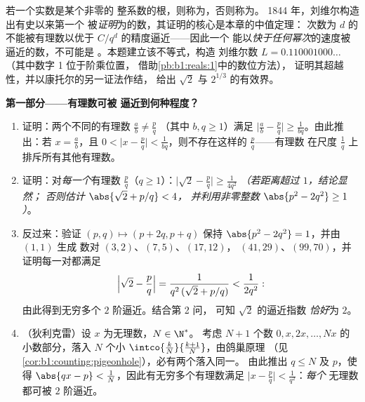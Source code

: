 \begin{problem}
\label{pb:b1:derivative:1}
若一个实数是某个非零的
整系数的根，则称为\emph{}，否则称为\emph{}。
1844 年，刘维尔构造出有史以来第一个
被\emph{证明}为的数，其证明的核心是本章的中值定理：
次数为 $d$ 的
不能被有理数以优于 $C/q^d$ 的精度逼近——因此一个
能以\emph{快于任何幂次}的速度被逼近的数，不可能是
。本题建立该不等式，构造
刘维尔数 $L = 0.110001000\dots$（其中数字 1 位于阶乘位置，
借助\cref{pb:b1:reals:1}中的数位方法），
证明其超越性，并以康托尔的另一证法作结，
给出 $\sqrt2$ 与
$2^{1/3}$ 的有效界。

\medskip
\noindent\textbf{第一部分——有理数可被
逼近到何种程度？}
\begin{enumerate}
  \item 证明：两个不同的有理数 $\frac ab \neq \frac pq$
        （其中 $b, q \geq 1$）满足 $\bigl|\frac ab -
        \frac pq\bigr| \geq \frac{1}{bq}$。由此推出：若 $x =
        \frac ab$，且 $0 < \bigl|x - \frac pq\bigr| <
        \frac{1}{bq}$，则不存在这样的 $\frac pq$——有理数
        在尺度 $\frac 1q$ 上排斥所有其他有理数。
  \item 证明：对\emph{每一个}有理数 $\frac pq$（$q \geq
        1$）：$\bigl|\sqrt2 - \frac pq\bigr| \geq
        \frac{1}{4q^2}$ \emph{（若距离超过 $1$，结论显然；
        否则估计 $\abs{\sqrt2 + p/q} < 4$，
        并利用非零整数 $\abs{p^2 - 2q^2} \geq 1$）}。
  \item 反过来：验证 $(p, q) \mapsto (p +
        2q, p + q)$ 保持 $\abs{p^2 - 2q^2} = 1$，并由 $(1,1)$ 生成
        数对 $(3,2)$、$(7,5)$、$(17,12)$，
        $(41,29)$、$(99,70)$，并证明每一对都满足
        \[
        \Bigl|\sqrt2 - \frac pq\Bigr| =
        \frac{1}{q^2\,(\sqrt2 + p/q)} < \frac{1}{2q^2} :
        \]
        由此得到无穷多个 $2$ 阶逼近。结合第 2 问，
        可知 $\sqrt 2$ 的逼近指数
        \emph{恰好}为 $2$。
  \item （狄利克雷）设 $x$ 为无理数，$N \in \N^*$。
        考虑 $N + 1$ 个数 $0, x, 2x,
        \dots, Nx$ 的小数部分，落入 $N$ 个小 $\intco{\frac kN}{\frac{k +
        1}{N}}$，由鸽巢原理
        （见\cref{cor:b1:counting:pigeonhole}），必有两个落入同一。
        由此推出 $q \leq N$ 及 $p$，使得 $\abs{qx - p} <
        \frac 1N$，因此有无穷多个有理数满足
        $\bigl|x - \frac pq\bigr| < \frac{1}{q^2}$：\emph{每个}
        无理数都可被 $2$ 阶逼近。
\end{enumerate}


\end{problem}
